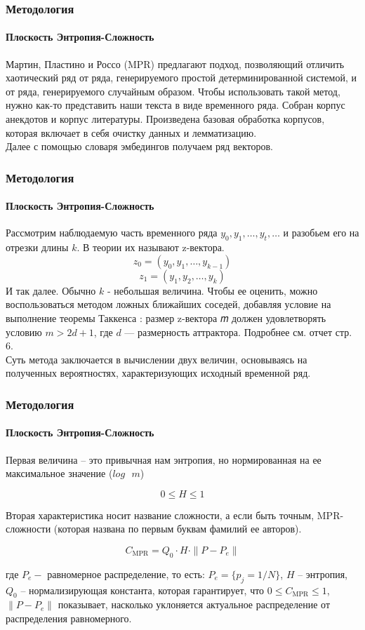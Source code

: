 \documentclass[aspectratio=169]{beamer}
\begin{document}
\begin{frame}
\frametitle{Методология}
\framesubtitle{Плоскость Энтропия-Сложность}

Мартин, Пластино и Россо (MPR) \cite{rosso_distinguishing_2007} предлагают подход, позволяющий отличить хаотический ряд от ряда, генерируемого простой детерминированной системой, и от ряда, генерируемого случайным образом. Чтобы использовать такой метод, нужно как-то представить наши текста в виде временного ряда. Собран корпус анекдотов и корпус литературы. Произведена базовая обработка корпусов, которая включает в себя очистку данных и лемматизацию. \\
Далее с помощью словаря эмбедингов получаем ряд векторов. 
	
\end{frame}

\begin{frame}
\frametitle{Методология}
\framesubtitle{Плоскость Энтропия-Сложность}
	Рассмотрим наблюдаемую часть временного ряда $ y_0, y_1, \dots, y_t, \dots $ и разобьем его на отрезки длины $k$. В теории их называют z-вектора.
	$$ 
	z_0 = (y_0, y_1, \dots, y_{k-1}) 
	$$
	$$
	z_1 = (y_1, y_2, \dots, y_{k}) 
	$$
	И так далее. Обычно $k$ - небольшая величина. Чтобы ее оценить, можно воспользоваться методом ложных ближайших соседей, добавляя условие на выполнение теоремы Таккенса \cite{rand_detecting_takkens_1981}: размер z-вектора 𝑚 должен удовлетворять условию $m > 2d + 1$, где $d$ — размерность аттрактора. Подробнее см. отчет стр. 6.  \\
	Суть метода заключается в вычислении двух величин, основываясь на полученных вероятностях, характеризующих исходный временной ряд.

\end{frame}

\begin{frame}
\frametitle{Методология}
\framesubtitle{Плоскость Энтропия-Сложность}
	Первая величина -- это привычная нам энтропия, но нормированная на ее максимальное значение ($log \text{ } m$)
	
	$$
	0 \leq H \leq 1 
	$$
	
	Вторая характеристика носит название сложности, а если быть точным, MPR-сложности (которая названа по первым буквам фамилий ее авторов).

	$$ 
	C_{\text{MPR}} = Q_0 \cdot H \cdot \|P - P_e\| 
	$$
	
	где $P_e - $ равномерное распределение, то есть: $P_e = \{p_j = 1/N\}$, $H$ -- энтропия, \\ $ Q_0$ -- нормализирующая константа, которая гарантирует, что $0 \leq C_{\text{MPR}} \leq 1$, $\|P - P_e\|$ показывает, насколько уклоняется актуальное распределение от распределения равномерного.
\end{frame}
\end{document}

